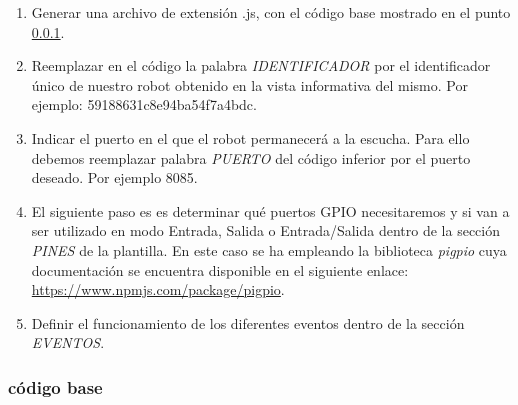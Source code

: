\begin{enumerate}
  \item Generar una archivo de extensión .js, con el código base mostrado en el punto \ref{codigo:base}.
  \item Reemplazar en el código la palabra \emph{IDENTIFICADOR} por el identificador único de nuestro robot obtenido en la vista informativa del mismo.
  Por ejemplo: 59188631c8e94ba54f7a4bdc.
  \item Indicar el puerto en el que el robot permanecerá a la escucha. Para ello debemos reemplazar palabra \emph{PUERTO} del código inferior por el puerto deseado. Por ejemplo 8085. 
  \item El siguiente paso es es determinar qué puertos GPIO necesitaremos y si van a ser utilizado en modo Entrada, Salida o Entrada/Salida dentro de la sección \emph{PINES} de la plantilla.
  En este caso se ha empleando la biblioteca \emph{pigpio} cuya documentación se encuentra disponible en el siguiente enlace: \url{https://www.npmjs.com/package/pigpio}.
  \item Definir el funcionamiento de los diferentes eventos dentro de la sección \emph{EVENTOS}.
\end{enumerate}


\subsubsection{código base}
\label{codigo:base}

